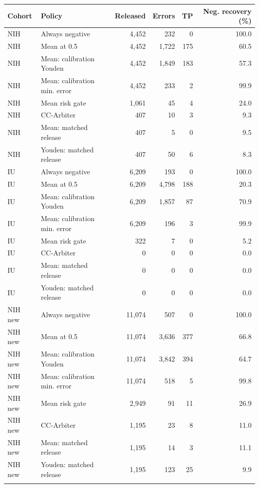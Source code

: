 \begin{center}\footnotesize\setlength{\tabcolsep}{4pt}\begin{tabular}{llrrrr}\toprule
Cohort & Policy & Released & Errors & TP & Neg. recovery (\%)\\\midrule
NIH & Always negative & 4,452 & 232 & 0 & 100.0 \\
NIH & Mean at 0.5 & 4,452 & 1,722 & 175 & 60.5 \\
NIH & Mean: calibration Youden & 4,452 & 1,849 & 183 & 57.3 \\
NIH & Mean: calibration min. error & 4,452 & 233 & 2 & 99.9 \\
NIH & Mean risk gate & 1,061 & 45 & 4 & 24.0 \\
NIH & CC-Arbiter & 407 & 10 & 3 & 9.3 \\
NIH & Mean: matched release & 407 & 5 & 0 & 9.5 \\
NIH & Youden: matched release & 407 & 50 & 6 & 8.3 \\
\addlinespace
IU & Always negative & 6,209 & 193 & 0 & 100.0 \\
IU & Mean at 0.5 & 6,209 & 4,798 & 188 & 20.3 \\
IU & Mean: calibration Youden & 6,209 & 1,857 & 87 & 70.9 \\
IU & Mean: calibration min. error & 6,209 & 196 & 3 & 99.9 \\
IU & Mean risk gate & 322 & 7 & 0 & 5.2 \\
IU & CC-Arbiter & 0 & 0 & 0 & 0.0 \\
IU & Mean: matched release & 0 & 0 & 0 & 0.0 \\
IU & Youden: matched release & 0 & 0 & 0 & 0.0 \\
\addlinespace
NIH new & Always negative & 11,074 & 507 & 0 & 100.0 \\
NIH new & Mean at 0.5 & 11,074 & 3,636 & 377 & 66.8 \\
NIH new & Mean: calibration Youden & 11,074 & 3,842 & 394 & 64.7 \\
NIH new & Mean: calibration min. error & 11,074 & 518 & 5 & 99.8 \\
NIH new & Mean risk gate & 2,949 & 91 & 11 & 26.9 \\
NIH new & CC-Arbiter & 1,195 & 23 & 8 & 11.0 \\
NIH new & Mean: matched release & 1,195 & 14 & 3 & 11.1 \\
NIH new & Youden: matched release & 1,195 & 123 & 25 & 9.9 \\
\addlinespace
\bottomrule\end{tabular}\end{center}
